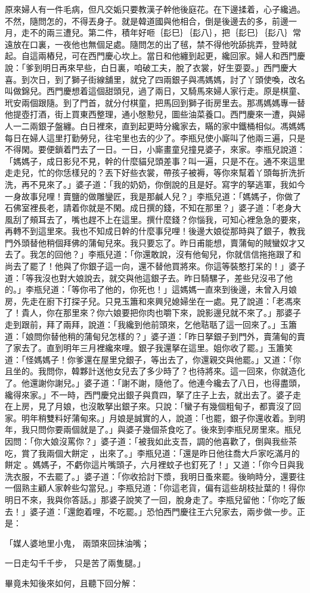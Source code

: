 原來婦人有一件毛病，但凡交姤只要教漢子幹他後庭花。在下邊揉着，心子纔過。不然，隨問怎的，不得丟身子。就是韓道國與他相合，倒是後邊去的多，前邊一月，走不的兩三遭兒。第二件，積年好咂｛髟巳｝｛髟八｝，把｛髟巳｝｛髟八｝常遠放在口裏，一夜他也無個足處。隨問怎的出了毧，禁不得他吮舔挑弄，登時就起。自這兩樁兒，可在西門慶心坎上。當日和他纏到起更，纔回家。婦人和西門慶說：「爹到明日再來早些，白日裏，咱破工夫，脫了衣裳，好生耍耍。」西門慶大喜。到次日，到了獅子街線舖里，就兌了四兩銀子與馮媽媽，討了丫頭使喚，改名叫做錦兒。西門慶想着這個甜頭兒，過了兩日，又騎馬來婦人家行走。原是棋童、玳安兩個跟隨。到了門首，就分付棋童，把馬回到獅子街房里去。那馮媽媽專一替他提壺打酒，街上買東西整理，通小慇懃兒，圖些油菜養口。西門慶來一遭，與婦人一二兩銀子盤纏。白日裡來，直到起更時分纔家去，瞞的家中鐵桶相似。馮媽媽每日在婦人這里打勤勞兒，往宅里也去的少了。李瓶兒使小廝叫了他兩三遍，只是不得閑。要便鎖着門去了一日。一日，小廝畫童兒撞見婆子，來家。李瓶兒說道：「媽媽子，成日影兒不見，幹的什麼貓兒頭差事？叫一遍，只是不在。通不來這里走走兒，忙的你恁樣兒的？丟下好些衣裳，帶孩子被褥，等你來幫着丫頭每折洗折洗，再不見來了。」婆子道：「我的奶奶，你倒說的且是好。寫字的拏逃軍，我如今一身故事兒哩！賣鹽的做雕鑾匠，我是那鹹人兒？」李瓶兒道：「媽媽子，你做了石佛室裡長老，請着你就是不閑。成日撰的錢，不知在那里？」婆子道：「老身大風刮了頰耳去了，嘴也趕不上在這里。撰什麼錢？你惱我，可知心裡急急的要來，再轉不到這里來。我也不知成日幹的什麼事兒哩！後邊大娘從那時與了銀子，教我門外頭替他稍個拜佛的蒲甸兒來。我只要忘了。昨日甫能想，賣蒲甸的賊蠻奴才又去了。我怎的回他？」李瓶兒道：「你還敢說，沒有他甸兒，你就信信拖拖跟了和尚去了罷了！他與了你銀子這一向，還不替他買將來。你這等裝憨打呆的！」婆子道：「等我沒也對大娘說去，就交與他這銀子去。昨日騎騾子，差些兒沒弔了他的。」李瓶兒道：「等你弔了他的，你死也！」這媽媽一直來到後邊，未曾入月娘房，先走在廚下打探子兒。只見玉簫和來興兒媳婦坐在一處。見了說道：「老馮來了！貴人，你在那里來？你六娘要把你肉也嚼下來，說影邊兒就不來了。」那婆子走到跟前，拜了兩拜，說道：「我纔到他前頭來，乞他聐聒了這一回來了。」玉簫道：「娘問你替他稍的蒲甸兒怎樣的？」婆子道：「昨日拏銀子到門外，賣蒲甸的賣了家去了。直到明年三月裡纔來哩。銀子我還拏在這里。姐你收了罷。」玉簫笑道：「怪媽媽子！你爹還在屋里兌銀子，等出去了，你還親交與他罷。」又道：「你且坐的。我問你，韓夥計送他女兒去了多少時了？也待將來。這一回來，你就造化了。他還謝你謝兒。」婆子道：「謝不謝，隨他了。他連今纔去了八日，也得盡頭，纔得來家。」不一時，西門慶兌出銀子與賁四，拏了庄子上去，就出去了。婆子走在上房，見了月娘，也沒敢拏出銀子來。只說：「蠻子有幾個粗甸子，都賣沒了回家。明年稍雙料好蒲甸來。」月娘是誠實的人，說道：「也罷，銀子你還收着。到明年，我只問你要兩個就是了。」與婆子幾個茶食吃了。後來到李瓶兒房里來。瓶兒因問：「你大娘沒罵你？」婆子道：「被我如此支吾，調的他喜歡了，倒與我些茶吃，賞了我兩個大餅定 ，出來了。」李瓶兒道：「還是昨日他往喬大戶家吃滿月的餅定 。媽媽子，不虧你這片嘴頭子，六月裡蚊子也釘死了！」又道：「你今日與我洗衣服，不去罷了。」婆子道：「你收拾討下漿，我明日蚤來罷。後晌時分，還要往一個熟主顧人家幹些勾當兒。」李瓶兒道：「你這老貨，偏有這些胡枝扯葉的！得你明日不來，我與你答話。」那婆子說笑了一回，脫身走了。李瓶兒留他：「你吃了飯去！」婆子道：「還飽着哩，不吃罷。」恐怕西門慶往王六兒家去，兩步做一步。正是：

「媒人婆地里小鬼，  兩頭來回抹油嘴；

一日走勾千千步，  只是苦了兩隻腿。」

畢竟未知後來如何，且聽下回分解：


